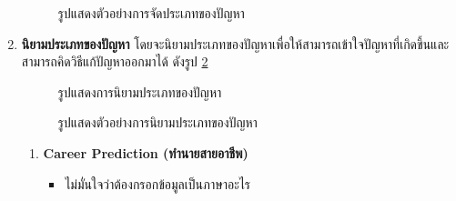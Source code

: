 \begin{enumerate}
\begin{figure}[H]
              \caption{รูปแสดงตัวอย่างการจัดประเภทของปัญหา}\label{fig:exam-Groping}
          \end{figure}
    \item \textbf{นิยามประเภทของปัญหา} โดยจะนิยามประเภทของปัญหาเพื่อให้สามารถเข้าใจปัญหาที่เกิดขึ้นและสามารถคิดวิธีแก้ปัญหาออกมาได้ ดังรูป \ref{fig:CreateTheme}
          \begin{figure}[H]\centering
              \caption{รูปแสดงการนิยามประเภทของปัญหา}\label{fig:CreateTheme}
          \end{figure}
          \begin{figure}[H]\centering
              \caption{รูปแสดงตัวอย่างการนิยามประเภทของปัญหา}\label{fig:exam-CreateTheme}
          \end{figure}
          \begin{enumerate}
              \item \textbf{Career Prediction (ทำนายสายอาชีพ)}
                    \begin{itemize}
                        \item ไม่มั่นใจว่าต้องกรอกข้อมูลเป็นภาษาอะไร

\end{itemize}
\end{enumerate}
\end{enumerate}
